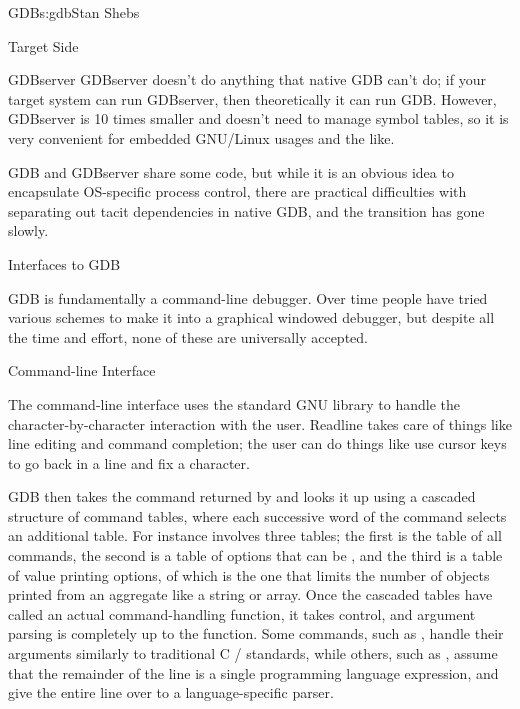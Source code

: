 \begin{aosachapter}{GDB}{s:gdb}{Stan Shebs}
\begin{aosasect1}{Target Side}
\begin{aosasect2}{GDBserver}
GDBserver doesn't do anything that native GDB can't do; if your target
system can run GDBserver, then theoretically it can run GDB.  However,
GDBserver is 10 times smaller and doesn't need to manage symbol
tables, so it is very convenient for embedded GNU/Linux usages and the
like.


GDB and GDBserver share some code, but while it is an obvious idea to
encapsulate OS-specific process control, there are practical difficulties
with separating out tacit dependencies in native GDB, and the transition
has gone slowly.

\end{aosasect2}

\end{aosasect1}

\begin{aosasect1}{Interfaces to GDB}

GDB is fundamentally a command-line debugger.  Over time people have
tried various schemes to make it into a graphical windowed debugger,
but despite all the time and effort, none of these are universally
accepted.

\begin{aosasect2}{Command-line Interface}

The command-line interface uses the standard GNU library
 to handle the character-by-character interaction with
the user.  Readline takes care of things like line editing and command
completion; the user can do things like use cursor keys to go back in
a line and fix a character.

GDB then takes the command returned by  and looks it up
using a cascaded structure of command tables, where each successive
word of the command selects an additional table.  For instance
 involves three tables; the first is the
table of all commands, the second is a table of options that can be
, and the third is a table of value printing options, of
which  is the one that limits the number of objects
printed from an aggregate like a string or array.  Once the cascaded
tables have called an actual command-handling function, it takes
control, and argument parsing is completely up to the function.  Some
commands, such as , handle their arguments similarly to
traditional C / standards, while others, such as
, assume that the remainder of the line is a single
programming language expression, and give the entire line over to a
language-specific parser.


\end{aosasect2}
\end{aosasect1}
\end{aosachapter}

